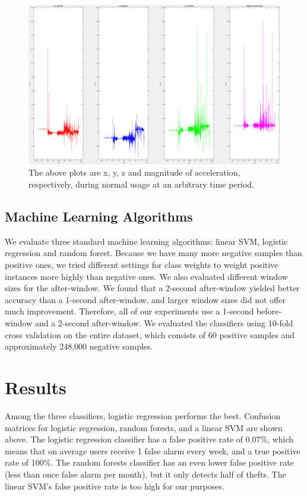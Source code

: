 \documentclass{soups}
\begin{document}
\begin{figure}[t]
\includegraphics[width=1.0\columnwidth]{neg_acc_separated.png}
\caption{The above plots are x, y, z and magnitude of acceleration, respectively, during normal usage at an arbitrary time period.}
\end{figure}



\subsection{Machine Learning Algorithms}
We evaluate three standard machine learning algorithms: linear SVM, logistic regression and random forest.
Because we have many more negative samples than positive ones, we tried different settings for class weights to weight positive instances more highly than negative ones.
We also evaluated different window sizes for the after-window.
We found that a 2-second after-window yielded better accuracy than a 1-second after-window, and larger window sizes did not offer much improvement.
Therefore, all of our experiments use a 1-second before-window and a 2-second after-window.
We evaluated the classifiers using 10-fold cross validation on the entire dataset, which consists of 60 positive samples and approximately 248,000 negative samples. 



\section{Results}
Among the three classifiers, logistic regression performs the best.
Confusion matrices for logistic regression, random forests, and a linear SVM
are shown above.
The logistic regression classifier has a false positive rate of 0.07\%, which means that on average users receive 1 false alarm every week, and a true positive rate of 100\%.
The random forests classifier has an even lower false positive rate (less than once false alarm per month),
but it only detects half of thefts.
The linear SVM's false positive rate is too high for our purposes.
\end{document}
